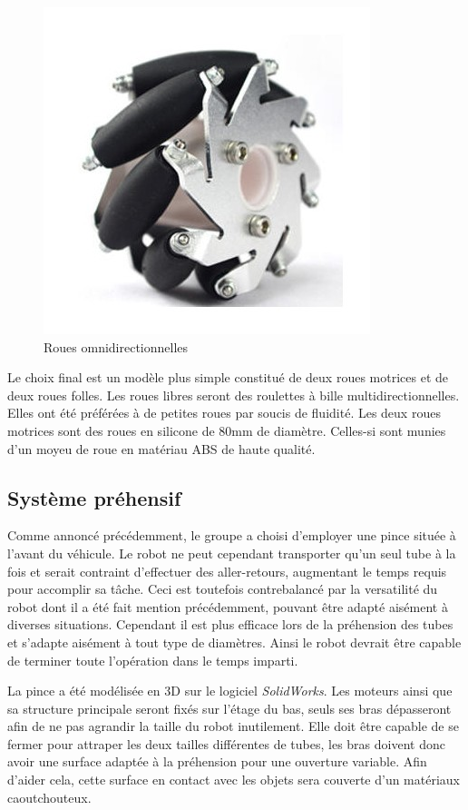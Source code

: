 \documentclass[a4paper,11pt]{article}
\begin{document}
\begin{figure}[H]
    \centering
    \includegraphics[scale = 0.4]{mecanum.jpg}
    \caption{Roues omnidirectionnelles\cite{mecanum}}
    \label{fig:mecanum}
\end{figure}

Le choix final est un modèle plus simple constitué de deux roues motrices et de deux roues folles. Les roues libres seront des roulettes à bille multidirectionnelles. Elles ont été préférées à de petites roues par soucis de fluidité. Les deux roues motrices sont des roues en silicone de 80mm de diamètre. Celles-si sont munies d'un moyeu de roue en matériau ABS de haute qualité. 

\subsection{Système préhensif}

Comme annoncé précédemment, le groupe a choisi d'employer une pince située à l'avant du véhicule. Le robot ne peut cependant transporter qu'un seul tube à la fois et serait contraint d'effectuer des aller-retours, augmentant le temps requis pour accomplir sa tâche. Ceci est toutefois contrebalancé par la versatilité du robot dont il a été fait mention précédemment, pouvant être adapté aisément à diverses situations. Cependant il est plus efficace lors de la préhension des tubes et s'adapte aisément à tout type de diamètres. Ainsi le robot devrait être capable de terminer toute l'opération dans le temps imparti.

La pince a été modélisée en 3D sur le logiciel \textit{SolidWorks}. Les moteurs ainsi que sa structure principale seront fixés sur l'étage du bas, seuls ses bras dépasseront afin de ne pas agrandir la taille du robot inutilement. Elle doit être capable de se fermer pour attraper les deux tailles différentes de tubes, les bras doivent donc avoir une surface adaptée à la préhension pour une ouverture variable. Afin d'aider cela, cette surface en contact avec les objets sera couverte d'un matériaux caoutchouteux.
\end{document}
